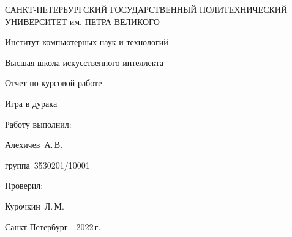 \documentclass[a4paper,12pt]{article}
\begin{document}
    \begin{center}
        \thispagestyle{empty}
        \large САНКТ-ПЕТЕРБУРГСКИЙ ГОСУДАРСТВЕННЫЙ ПОЛИТЕХНИЧЕСКИЙ УНИВЕРСИТЕТ им. ПЕТРА ВЕЛИКОГО

        Институт компьютерных наук и технологий

        Высшая школа искусственного интеллекта
        \vspace{9cm}

        Отчет по курсовой работе

        \huge Игра в дурака
    \end{center}
    \vspace{6cm}
    \begin{flushright}
        \large
        Работу выполнил:

        Алехичев~А.\,В.

        группа~3530201/10001
        \vspace{2mm}

        Проверил:

        Курочкин~Л.\,М.
    \end{flushright}
    \begin{center}
        \large Санкт-Петербург - 2022\,г.
    \end{center}

    \newpage

    \tableofcontents

    \newpage
\end{document}
